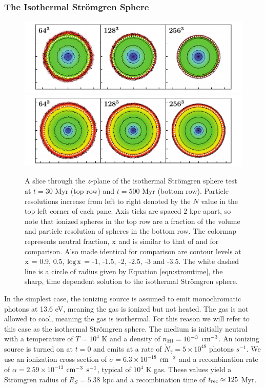 \documentclass[fleq,usenatbib]{mnras}
\newcommand{\strom}{Str\"omgren}
\begin{document}
\subsubsection{The Isothermal \strom{} Sphere}
\begin{figure}
\includegraphics[width=1\linewidth]{Figures/strom_slice_iso_030.pdf}
\includegraphics[width=1\linewidth]{Figures/strom_slice_iso_500.pdf}
\caption{A slice through the $z$-plane of the isothermal \strom{} sphere
test at $t=30$ Myr (top row) and $t=500$ Myr (bottom row). Particle 
resolutions increase from left to right denoted by the $N$ value in the top 
left corner of each pane. Axis ticks are spaced 2 kpc apart, so note that 
ionized spheres in the top row are a fraction of the volume and particle 
resolution of spheres in the bottom row. The colormap represents neutral 
fraction, $\rm x$ and is similar to that of \protect\cite{pawlikSchaye08} and 
\protect\cite{pawlikSchaye11} for comparison. Also made identical for 
comparison are contour levels at $\rm x$ = 0.9, 0.5, $\log \rm x$ = -1, -1.5, 
-2, -2.5, -3 and -3.5. The white dashed line is a circle of radius given by 
Equation \ref{eqn:stromtime}, the sharp, time dependent solution to the 
isothermal \strom{} sphere.}
\label{fig:stromslice}
\end{figure}
In the simplest case, the ionizing source is assumed to emit monochromatic 
photons at 13.6 eV, meaning the gas is ionized but not heated. The gas is not 
allowed to cool, meaning the gas is isothermal. For this reason we will refer 
to this case as the isothermal \strom{} sphere. The medium is initially 
neutral with a temperature of $T=10^4$ K and a density of $n_{\rm HI} = 
10^{-3}$ $\rm cm^{-3}$. An ionizing source is turned on at $t=0$ and emits at 
a rate of $\dot{N}_\gamma = 5 \times 10^{48}$ photons $s^{-1}$. We use an 
ionization cross section of $\sigma = 6.3 \times 10^{-18}$ $\rm cm^{-2}$ and a 
recombination rate of $\alpha = 2.59 \times 10^{-13}$ $\rm cm^{-3}$ $\rm 
s^{-1}$, typical of $10^4$ K gas. These values yield a \strom{} radius of 
$R_S = 5.38$ kpc and a recombination time of $t_{\rm rec} \approx  125$ Myr. 
\end{document}
